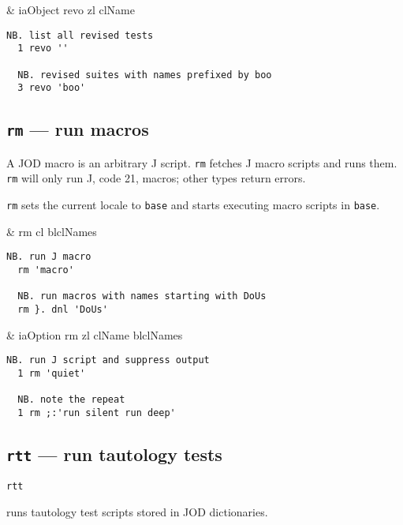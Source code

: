 \begin{wordhead}
\dyad & iaObject revo zl \argsep clName \\
\end{wordhead}
\begin{lstlisting}[frame=single,framerule=0pt] 
  NB. list all revised tests
  1 revo ''  
  
  NB. revised suites with names prefixed by boo 
  3 revo 'boo'  
\end{lstlisting}                  


\subsection{\texttt{rm} --- run macros}\label{ss:rm}
 
A JOD macro is an arbitrary J script.  \hypertarget{il:rm}{\texttt{rm}} 
fetches J macro scripts and runs them. \texttt{rm} will only run J, code 21, macros; other types return errors.  

\texttt{rm} sets the current locale to \texttt{base} and starts 
executing macro scripts in \texttt{base}. 

\begin{wordhead}
\monad & rm cl \argsep blclNames \\
\end{wordhead}
\begin{lstlisting}[frame=single,framerule=0pt] 
  NB. run J macro 
  rm 'macro' 

  NB. run macros with names starting with DoUs
  rm }. dnl 'DoUs' 
\end{lstlisting}   

\begin{wordhead}
\dyad & iaOption rm zl \argsep clName \argsep blclNames \\
\end{wordhead}
\begin{lstlisting}[frame=single,framerule=0pt] 
  NB. run J script and suppress output 
  1 rm 'quiet' 

  NB. note the repeat 
  1 rm ;:'run silent run deep' 
\end{lstlisting}                  


\subsection{\texttt{rtt} --- run tautology tests}\label{ss:rtt}

\hypertarget{il:rtt}{\texttt{rtt}} runs tautology 
test scripts stored in JOD dictionaries. 

